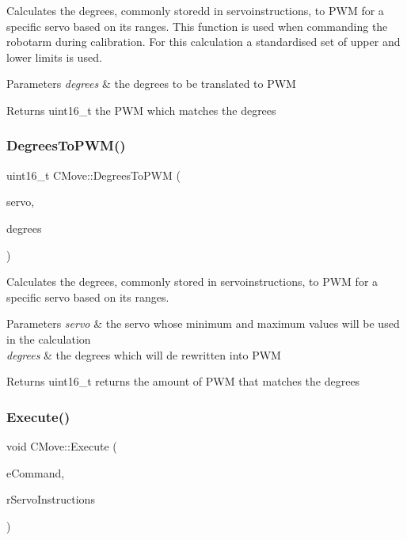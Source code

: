 Calculates the degrees, commonly storedd in servoinstructions, to P\+WM for a specific servo based on its ranges. This function is used when commanding the robotarm during calibration. For this calculation a standardised set of upper and lower limits is used. 


\begin{DoxyParams}{Parameters}
{\em degrees} & the degrees to be translated to P\+WM \\
\hline
\end{DoxyParams}
\begin{DoxyReturn}{Returns}
uint16\+\_\+t the P\+WM which matches the degrees 
\end{DoxyReturn}
\mbox{\label{classCMove_a716dede77aa60e3b3254f1d436cf2c40}} 
\subsubsection{\texorpdfstring{Degrees\+To\+P\+W\+M()}{DegreesToPWM()}}
{\footnotesize\ttfamily uint16\+\_\+t C\+Move\+::\+Degrees\+To\+P\+WM (\begin{DoxyParamCaption}\item[{e\+Servos}]{servo,  }\item[{int16\+\_\+t}]{degrees }\end{DoxyParamCaption})}



Calculates the degrees, commonly stored in servoinstructions, to P\+WM for a specific servo based on its ranges. 


\begin{DoxyParams}{Parameters}
{\em servo} & the servo whose minimum and maximum values will be used in the calculation \\
\hline
{\em degrees} & the degrees which will de rewritten into P\+WM \\
\hline
\end{DoxyParams}
\begin{DoxyReturn}{Returns}
uint16\+\_\+t returns the amount of P\+WM that matches the degrees 
\end{DoxyReturn}
\mbox{\label{classCMove_a0c7bf10c045b4369b0d32a63d93ed990}} 
\subsubsection{\texorpdfstring{Execute()}{Execute()}}
{\footnotesize\ttfamily void C\+Move\+::\+Execute (\begin{DoxyParamCaption}\item[{e\+Command}]{e\+Command,  }\item[{std\+::vector$<$ std\+::shared\+\_\+ptr$<$ \hyperlink{classCServoInstruction}{C\+Servo\+Instruction} $>$$>$}]{r\+Servo\+Instructions }\end{DoxyParamCaption})}



